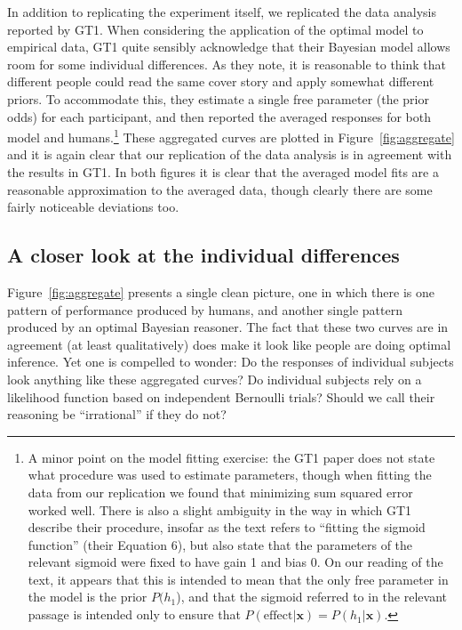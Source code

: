 \documentclass[doc,floatsintext]{apa6}
\begin{document}
In addition to replicating the experiment itself, we replicated the data analysis reported by GT1. When considering the application of the optimal model to empirical data, GT1 quite sensibly acknowledge that their Bayesian model allows room for some individual differences. As they note, it is reasonable to think that different people could read the same cover story and apply somewhat different priors. To accommodate this, they estimate a single free parameter (the prior odds) for each participant, and then reported the averaged responses for both model and humans.\footnote{A minor point on the model fitting exercise: the GT1 paper does not state what procedure was used to estimate parameters, though when fitting the data from our replication we found that minimizing sum squared error worked well. There is also a slight ambiguity in the way in which GT1 describe their procedure, insofar as the text refers to ``fitting the sigmoid function'' (their Equation 6), but also state that the parameters of the relevant sigmoid were fixed to have gain 1 and bias 0. On our reading of the text, it appears that this is intended to mean that the only free parameter in the model is the prior $P(h_1$), and that the sigmoid referred to in the relevant passage is intended only to ensure that $P(\mbox{effect}|\bm{x}) = P(h_1 | \bm{x})$.} These aggregated curves are plotted in Figure~\ref{fig:aggregate} and it is again clear that our replication of the data analysis is in agreement with the results in GT1. In both figures it is clear that the averaged model fits are a reasonable approximation to the averaged data, though clearly there are some fairly noticeable deviations too.

\subsection{A closer look at the individual differences}

Figure~\ref{fig:aggregate} presents a single clean picture, one in which there is one pattern of performance produced by humans, and another single pattern produced by an optimal Bayesian reasoner. The fact that these two curves are in agreement (at least qualitatively) does make it look like people are doing optimal inference. Yet one is compelled to wonder: Do the responses of individual subjects look anything like these aggregated curves? Do individual subjects rely on a likelihood function based on independent Bernoulli trials? Should we call their reasoning be ``irrational'' if they do not?
\end{document}
